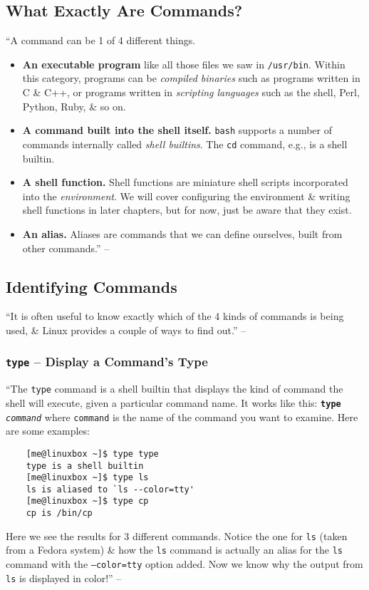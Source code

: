 \documentclass[oneside]{book}
\numberwithin{equation}{section}
\begin{document}
\subsection{What Exactly Are Commands?}
``A command can be 1 of 4 different things.
\begin{itemize}
	\item \textbf{An executable program} like all those files we saw in \texttt{/usr/bin}. Within this category, programs can be \textit{compiled binaries} such as programs written in C \& C++, or programs written in \textit{scripting languages} such as the shell, Perl, Python, Ruby, \& so on.
	\item \textbf{A command built into the shell itself.} \texttt{bash} supports a number of commands internally called \textit{shell builtins}. The \texttt{cd} command, e.g., is a shell builtin.
	\item \textbf{A shell function.} Shell functions are miniature shell scripts incorporated into the \textit{environment}. We will cover configuring the environment \& writing shell functions in later chapters, but for now, just be aware that they exist.
	\item \textbf{An alias.} Aliases are commands that we can define ourselves, built from other commands.'' -- \cite[pp. 83--84]{Shotts2019}
\end{itemize}

\subsection{Identifying Commands}
``It is often useful to know exactly which of the 4 kinds of commands is being used, \& Linux provides a couple of ways to find out.'' -- \cite[p. 84]{Shotts2019}

\subsubsection{\texttt{type} -- Display a Command's Type}
``The \texttt{type} command is a shell builtin that displays the kind of command the shell will execute, given a particular command name. It works like this: \texttt{\textbf{type} \textit{command}} where \texttt{command} is the name of the command you want to examine. Here are some examples:
\begin{verbatim}
	[me@linuxbox ~]$ type type
	type is a shell builtin
	[me@linuxbox ~]$ type ls
	ls is aliased to `ls --color=tty'
	[me@linuxbox ~]$ type cp
	cp is /bin/cp
\end{verbatim}
Here we see the results for 3 different commands. Notice the one for \texttt{ls} (taken from a Fedora system) \& how the \texttt{ls} command is actually an alias for the \texttt{ls} command with the \texttt{--color=tty} option added. Now we know why the output from \texttt{ls} is displayed in color!'' -- \cite[pp. 84--85]{Shotts2019}
\end{document}
